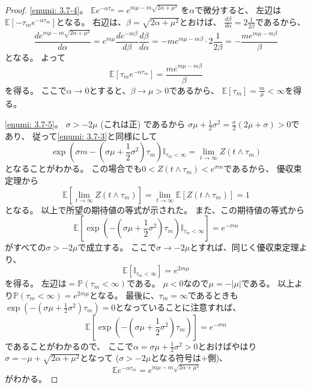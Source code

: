 \documentclass[uplatex]{jsarticle}
\theoremstyle{definition}
\def\P{\mathbb{P}}
\def\E{\mathbb{E}}
\def\I{\mathbb{I}}
\begin{document}
\begin{proof}
  \ref{enumi: 3.7-4}。
  \(\E e^{-\alpha\tau_m} = e^{m\mu-m\sqrt{2\alpha+\mu^2}}\)
  を\(\alpha\)で微分すると、
  左辺は\(\E\left[ -\tau_me^{-\alpha\tau_m}\right]\)となる。
  右辺は、\(\beta = \sqrt{2\alpha+\mu^2}\)とおけば、
  \(\frac{d\beta}{d\alpha} = 2\frac{1}{2\beta}\)であるから、
  \[
  \frac{de^{m\mu-m\sqrt{2\alpha+\mu^2}}}{d\alpha}
  = e^{m\mu}\frac{de^{-m\beta}}{d\beta}\frac{d\beta}{d\alpha}
  = -me^{m\mu-m\beta}\cdot 2\frac{1}{2\beta}
  = -\frac{me^{m\mu-m\beta}}{\beta}
  \]
  となる。
  よって
  \[
  \E\left[ \tau_me^{-\alpha\tau_m}\right]
  = \frac{me^{m\mu-m\beta}}{\beta}
  \]
  を得る。
  ここで\(\alpha\to 0\)とすると、\(\beta \to \mu > 0\)であるから、
  \(\E[\tau_m] = \frac{m}{\mu} < \infty\)を得る。

  \ref{enumi: 3.7-5}。
  \(\sigma > -2\mu\) (これは正) であるから
  \(\sigma\mu + \frac{1}{2}\sigma^2
  = \frac{\sigma}{2}( 2\mu + \sigma) > 0\)であり、
  従って\ref{enumi: 3.7-3}と同様にして
  \[
  \exp\left(
  \sigma m - \left( \sigma\mu + \frac{1}{2}\sigma^2\right)\tau_m
  \right) \I_{\tau_m < \infty}
  = \lim_{t\to \infty} Z(t\wedge \tau_m)
  \]
  となることがわかる。
  この場合でも\(0 < Z(t\wedge \tau_m) < e^{\sigma m}\)であるから、
  優収束定理から
  \[
  \E \left[ \lim_{t\to \infty} Z(t\wedge \tau_m) \right]
  = \lim_{t\to \infty} \E [Z(t\wedge \tau_m)] = 1
  \]
  となる。
  以上で所望の期待値の等式が示された。
  また、この期待値の等式から
  \[
  \E \left[ \exp\left( - \left( \sigma\mu + \frac{1}{2}\sigma^2\right)\tau_m
  \right) \I_{\tau_m < \infty} \right] = e^{-\sigma m}
  \]
  がすべての\(\sigma > -2\mu\)で成立する。
  ここで\(\sigma \to -2\mu\)とすれば、同じく優収束定理より、
  \[
  \E \left[ \I_{\tau_m < \infty} \right] = e^{2m\mu}
  \]
  を得る。
  左辺は\(=\P(\tau_m < \infty)\)である。
  \(\mu < 0\)なので\(\mu = -|\mu|\)である。
  以上より\(\P(\tau_m < \infty) = e^{2m\mu}\)となる。
  最後に、\(\tau_m = \infty\)であるときも
  \(\exp\left( - \left( \sigma\mu + \frac{1}{2}\sigma^2\right)\tau_m
  \right) = 0\)となっていることに注意すれば、
  \[
  \E \left[ \exp\left( - \left( \sigma\mu + \frac{1}{2}\sigma^2\right)\tau_m
  \right)\right] = e^{-\sigma m}
  \]
  であることがわかるので、
  ここで\(\alpha = \sigma\mu + \frac{1}{2}\sigma^2 > 0\)とおけばやはり
  \(\sigma = -\mu + \sqrt{2\alpha + \mu^2}\)となって
  (\(\sigma > -2\mu\)となる符号は\(+\)側)、
  \[
  \E e^{-\alpha \tau_m} = e^{m\mu - m\sqrt{2\alpha + \mu^2}}
  \]
  がわかる。
\end{proof}
\end{document}
